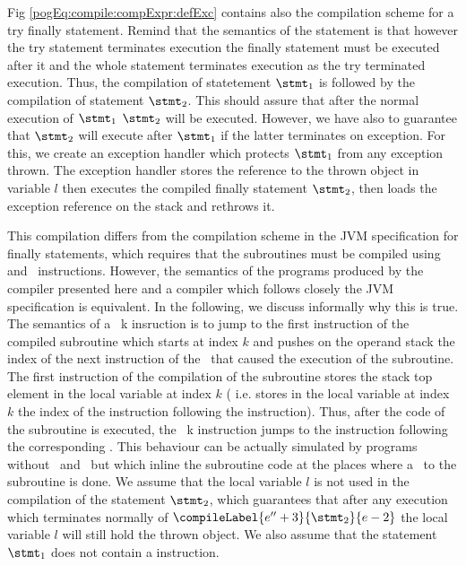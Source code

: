  Fig \ref{pogEq:compile:compExpr:defExc} contains also the compilation scheme for a try finally statement.
 Remind that  the semantics of the statement is that however the try statement terminates execution 
 the finally statement must be executed after it and the whole statement terminates execution as the try terminated execution.
 Thus, the compilation of statetement $\stmt_1$ is followed by 
 the compilation of statement $\stmt_2$. This should assure that after the normal execution of  $\stmt_1$ $\stmt_2$
 will be executed. However, we have also to guarantee that  $\stmt_2$ will execute after $\stmt_1$ if the latter 
 terminates on exception. For this, we create an exception handler  which protects $\stmt_1$ from any exception thrown.
 The exception handler stores the reference to the thrown object in variable  $l$ then executes the compiled
 finally statement  $\stmt_2$, then loads the exception reference on the stack and rethrows it.
  
 

 This compilation differs from the compilation scheme in the JVM specification for finally statements, which requires that the subroutines must be compiled using  and 
 \ret \ instructions. However, the semantics of the programs produced by the compiler presented here and a compiler which follows closely the JVM specification 
 is equivalent. 
 In the following, we discuss informally why this is true.
 The semantics of a \jsr \ k insruction is to  jump to the first instruction of the compiled subroutine which starts at index $k$ and pushes on the
 operand stack the index of the next instruction of the \jsr \ that caused the execution of the subroutine. 
 The first instruction of the compilation
 of the subroutine stores the stack top element in the local variable at index $k$ ( i.e. stores in the local variable at index $k$ the
 index of the instruction following the \jsr{} instruction). Thus, after the code of the subroutine is 
 executed, the \ret \ k instruction jumps to 
 the instruction following the corresponding \jsr. This behaviour can be actually simulated by programs without \jsr \ and \ret \ but which inline the subroutine code
 at the places where a \jsr \ to the subroutine is done.
 We assume that the local variable $l$ is not used in the compilation of the statement $\stmt_2$, which guarantees that after any execution which 
 terminates normally of $\compileLabel{e'' + 3}{\stmt_2}{e - 2}$ the local variable  $l$ will still hold the thrown object. We also assume that the 
 statement $\stmt_1$ does not contain a \return{} instruction. 





